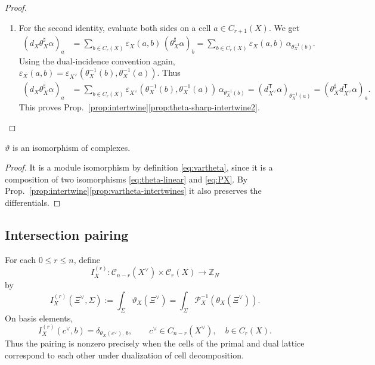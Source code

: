 \begin{proof}
\begin{enumerate}
		\item For the second identity, evaluate both sides on a cell \(a\in C_{r+1}(X)\). We get
		\begin{align}
			\left(d_X\theta_X^\sharp\alpha\right)_a
			&=
			\sum_{b\in C_r(X)}
			\varepsilon_X(a,b)\,
			(\theta_X^\sharp\alpha)_b
			=
			\sum_{b\in C_r(X)}
			\varepsilon_X(a,b)\,
			\alpha_{\theta_X^{-1}(b)}.
		\end{align}
		Using the dual-incidence convention again, $\varepsilon_X(a,b) = \varepsilon_{X^\vee}\left(\theta_X^{-1}(b),\theta_X^{-1}(a)\right)$.
		Thus
		\begin{align*}
			\left(d_X\theta_X^\sharp\alpha\right)_a
			&=
			\sum_{b\in C_r(X)}
			\varepsilon_{X^\vee}\left(\theta_X^{-1}(b),\theta_X^{-1}(a)\right)\,
			\alpha_{\theta_X^{-1}(b)}
			=
			\left(d_{X^\vee}^{\mathsf T}\alpha\right)_{\theta_X^{-1}(a)}
			=
			\left(\theta_X^\sharp d_{X^\vee}^{\mathsf T}\alpha\right)_a.
		\end{align*}
		This proves Prop.~\ref{prop:intertwine}\ref{prop:theta-sharp-intertwine2}.
	\end{enumerate}
\end{proof}

\begin{cor}\label{cor:complexIso}
	$\vartheta$ is an isomorphism of complexes.
\end{cor}
\begin{proof}
	It is a module isomorphism by definition \eqref{eq:vartheta}, since it is a composition of two isomorphisms \eqref{eq:theta-linear} and \eqref{eq:PX}. By Prop.~\ref{prop:intertwine}\ref{prop:vartheta-intertwines} it also preserves the differentials.
\end{proof}


\subsection{Intersection pairing}
\label{sec:intersection}

For each \(0\le r\le n\), define
\begin{equation}
	I_X^{(r)}:
	\mathcal C_{n-r}(X^\vee)\times \mathcal C_r(X)\to \mathbb Z_N
	\label{eq:intersection}
\end{equation}
by
\begin{equation}
	I_X^{(r)}(\Xi^\vee,\Sigma)
	:=
	\int_\Sigma \vartheta_X(\Xi^\vee)
	=
	\int_\Sigma \mathcal P_X^{-1} \left(\theta_X(\Xi^\vee)\right).
	\label{eq:intersection-def}
\end{equation}
On basis elements,
\begin{equation}
	I_X^{(r)}(c^\vee,b)=\delta_{\theta_X(c^\vee),\,b},
	\qquad
	c^\vee\in C_{n-r}(X^\vee),\quad b\in C_r(X).
	\label{eq:intersection-basis}
\end{equation}
Thus the pairing is nonzero precisely when the cells of the primal and dual lattice correspond to each other under dualization of cell decomposition.

